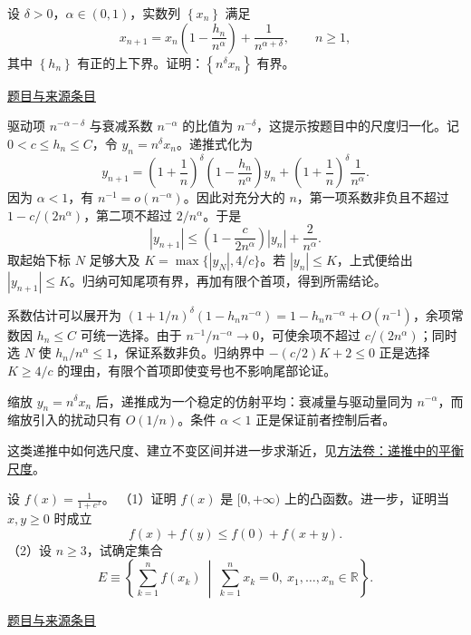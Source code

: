 \documentclass[UTF8,12pt,a4paper,fontset=fandol]{ctexart}
\begin{document}
\begin{example}[来源序号5]\label{ex:ch10-11th-A:5}\label{pr:ch10-11th-A:5}

设 $\delta>0$，$\alpha\in(0,1)$，实数列 $\left\{x_{n}\right\}$ 满足
\[
x_{n+1}=x_{n}\left(1-\frac{h_{n}}{n^{\alpha}}\right)+\frac{1}{n^{\alpha+\delta}},\qquad n\geq 1,
\]
其中 $\left\{h_{n}\right\}$ 有正的上下界。证明：$\left\{n^{\delta}x_{n}\right\}$ 有界。

\par\href{https://github.com/lzxcr/cmc-mathematics/blob/64916fa1fdbc3e444a652eca204d5669058ee321/src/problems/preliminary/11/05.md}{题目与来源条目}

\end{example}

\begin{solve}\label{ans:ch10-11th-A:5}

驱动项 $n^{-\alpha-\delta}$ 与衰减系数 $n^{-\alpha}$ 的比值为 $n^{-\delta}$，这提示按题目中的尺度归一化。记 $0<c\leq h_n\leq C$，令 $y_n=n^\delta x_n$。递推式化为
\[
y_{n+1}=\left(1+\frac1n\right)^\delta
\left(1-\frac{h_n}{n^\alpha}\right)y_n
+\left(1+\frac1n\right)^\delta\frac1{n^\alpha}.
\]
因为 $\alpha<1$，有 $n^{-1}=o(n^{-\alpha})$。因此对充分大的 $n$，第一项系数非负且不超过 $1-c/(2n^\alpha)$，第二项不超过 $2/n^\alpha$。于是
\[
|y_{n+1}|\leq\left(1-\frac{c}{2n^\alpha}\right)|y_n|+\frac2{n^\alpha}.
\]
取起始下标 $N$ 足够大及 $K=\max\{|y_N|,4/c\}$。若 $|y_n|\leq K$，上式便给出 $|y_{n+1}|\leq K$。归纳可知尾项有界，再加有限个首项，得到所需结论。

系数估计可以展开为 $(1+1/n)^\delta(1-h_n n^{-\alpha})=1-h_n n^{-\alpha}+O(n^{-1})$，余项常数因 $h_n\le C$ 可统一选择。由于 $n^{-1}/n^{-\alpha}\to0$，可使余项不超过 $c/(2n^\alpha)$；同时选 $N$ 使 $h_n/n^\alpha\le1$，保证系数非负。归纳界中 $-(c/2)K+2\le0$ 正是选择 $K\ge4/c$ 的理由，有限个首项即使变号也不影响尾部论证。

\end{solve}

\begin{remark}[方法与条件]缩放 $y_n=n^\delta x_n$ 后，递推成为一个稳定的仿射平均：衰减量与驱动量同为 $n^{-\alpha}$，而缩放引入的扰动只有 $O(1/n)$。条件 $\alpha<1$ 正是保证前者控制后者。

这类递推中如何选尺度、建立不变区间并进一步求渐近，见\hyperref[app:estimate-recursion]{方法卷：递推中的平衡尺度}。\end{remark}

\begin{example}[来源序号6]\label{ex:ch10-11th-A:6}\label{pr:ch10-11th-A:6}

设 $f(x)=\frac{1}{1+e^{x}}$。
（1）证明 $f(x)$ 是 $[0,+\infty)$ 上的凸函数。进一步，证明当 $x,y\geq 0$ 时成立
\[
f(x)+f(y)\leq f(0)+f(x+y).
\]
（2）设 $n\geq 3$，试确定集合
\[
E\equiv\left\{\sum_{k=1}^{n}f\left(x_{k}\right)\ \middle|\ \sum_{k=1}^{n}x_{k}=0,\ x_{1},\dots,x_{n}\in\mathbb{R}\right\}.
\]

\par\href{https://github.com/lzxcr/cmc-mathematics/blob/64916fa1fdbc3e444a652eca204d5669058ee321/src/problems/preliminary/11/06.md}{题目与来源条目}

\end{example}
\end{document}
